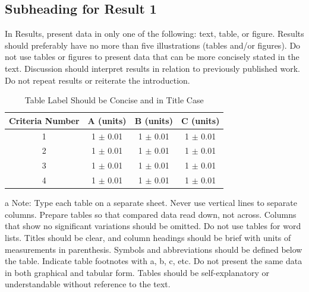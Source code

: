 \documentclass{strrespaper-journ}
\begin{document}
	    \subsection{Subheading for Result 1}
	        In Results, present data in only one of the following: text, table, or figure. Results should preferably have no more than five illustrations (tables and/or figures). Do not use tables or figures to present data that can be more concisely stated in the text. Discussion should interpret results in relation to previously published work. Do not repeat results or reiterate the introduction.
	        \begin{table}[htbp]
	            \begin{threeparttable}
	                \caption{Table Label Should be Concise and in Title Case }
	                \label{tab:concise_table}
	                \begin{tabular}{cccc}
	                    \toprule
	                    Criteria Number & A (units)       & B (units)       & C (units)       \\
	                    \midrule
	                    1               & 1 \(\pm \) 0.01 & 1 \(\pm \) 0.01 & 1 \(\pm \) 0.01 \\
	                    2               & 1 \(\pm \) 0.01 & 1 \(\pm \) 0.01 & 1 \(\pm \) 0.01 \\
	                    3               & 1 \(\pm \) 0.01 & 1 \(\pm \) 0.01 & 1 \(\pm \) 0.01 \\
	                    4               & 1 \(\pm \) 0.01 & 1 \(\pm \) 0.01 & 1 \(\pm \) 0.01 \\
	                    \bottomrule
	                \end{tabular}
	                \begin{tablenotes}
	                    \item[a] Note: Type each table on a separate sheet.
	                    Never use vertical lines to separate columns.
	                    Prepare tables so that compared data read down, not across.
	                    Columns that show no significant variations should be omitted.
	                    Do not use tables for word lists.
	                    Titles should be clear, and column headings should be brief with units of measurements in parenthesis.
	                    Symbols and abbreviations should be defined below the table.
	                    Indicate table footnotes with a, b, c, etc.
	                    Do not present the same data in both graphical and tabular form.
	                    Tables should be self-explanatory or understandable without reference to the text.
	                \end{tablenotes}
	            \end{threeparttable}
	        \end{table}
\end{document}
